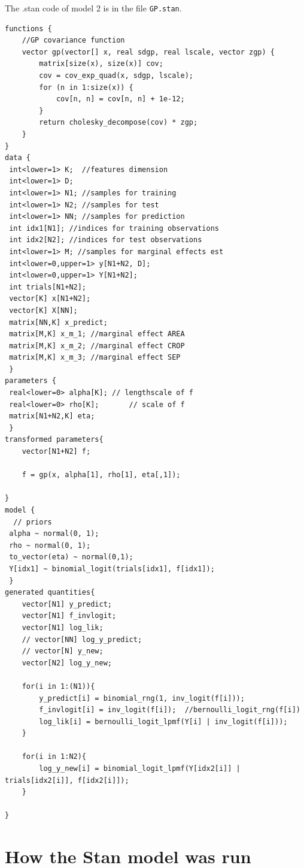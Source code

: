 \documentclass[a4paper]{artikel3}
\begin{document}
The .stan code of model 2 is in the file \texttt{GP.stan}.

\begin{lstlisting}
functions {
	//GP covariance function
	vector gp(vector[] x, real sdgp, real lscale, vector zgp) { 
		matrix[size(x), size(x)] cov;
		cov = cov_exp_quad(x, sdgp, lscale);
		for (n in 1:size(x)) {
			cov[n, n] = cov[n, n] + 1e-12;
		}
		return cholesky_decompose(cov) * zgp;
	}
}
data {
 int<lower=1> K;  //features dimension
 int<lower=1> D;
 int<lower=1> N1; //samples for training
 int<lower=1> N2; //samples for test
 int<lower=1> NN; //samples for prediction
 int idx1[N1]; //indices for training observations
 int idx2[N2]; //indices for test observations
 int<lower=1> M; //samples for marginal effects est
 int<lower=0,upper=1> y[N1+N2, D];
 int<lower=0,upper=1> Y[N1+N2];
 int trials[N1+N2];
 vector[K] x[N1+N2];
 vector[K] X[NN];
 matrix[NN,K] x_predict;
 matrix[M,K] x_m_1; //marginal effect AREA
 matrix[M,K] x_m_2; //marginal effect CROP
 matrix[M,K] x_m_3; //marginal effect SEP
 }
parameters {
 real<lower=0> alpha[K]; // lengthscale of f
 real<lower=0> rho[K];       // scale of f
 matrix[N1+N2,K] eta;
 }
transformed parameters{
	vector[N1+N2] f;
	
	f = gp(x, alpha[1], rho[1], eta[,1]);

}
model {
  // priors
 alpha ~ normal(0, 1);
 rho ~ normal(0, 1);
 to_vector(eta) ~ normal(0,1);
 Y[idx1] ~ binomial_logit(trials[idx1], f[idx1]);
 }    
generated quantities{
	vector[N1] y_predict;
	vector[N1] f_invlogit;
	vector[N1] log_lik;
	// vector[NN] log_y_predict;
	// vector[N] y_new;
	vector[N2] log_y_new;
	
	for(i in 1:(N1)){
		y_predict[i] = binomial_rng(1, inv_logit(f[i]));
		f_invlogit[i] = inv_logit(f[i]);  //bernoulli_logit_rng(f[i])
		log_lik[i] = bernoulli_logit_lpmf(Y[i] | inv_logit(f[i]));
	}
	
	for(i in 1:N2){
		log_y_new[i] = binomial_logit_lpmf(Y[idx2[i]] | trials[idx2[i]], f[idx2[i]]);
	}
	
}

\end{lstlisting}

\section{How the Stan model was run}
\end{document}

